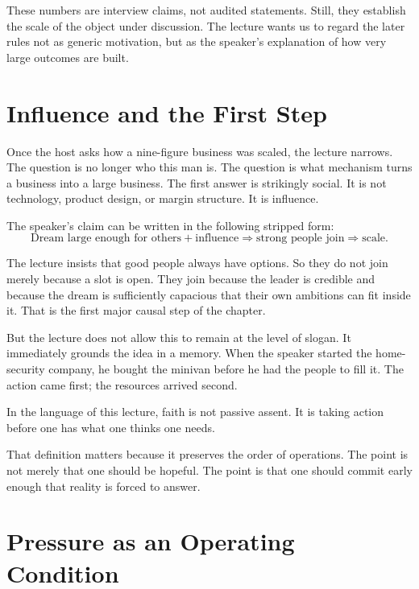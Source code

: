 These numbers are interview claims, not audited statements. Still, they establish the scale of the object under discussion. The lecture wants us to regard the later rules not as generic motivation, but as the speaker's explanation of how very large outcomes are built.

\section{Influence and the First Step}

Once the host asks how a nine-figure business was scaled, the lecture narrows. The question is no longer who this man is. The question is what mechanism turns a business into a large business. The first answer is strikingly social. It is not technology, product design, or margin structure. It is influence.

The speaker's claim can be written in the following stripped form:
\begin{equation}
\text{Dream large enough for others} + \text{influence}
\Longrightarrow
\text{strong people join}
\Longrightarrow
\text{scale}.
\end{equation}

The lecture insists that good people always have options. So they do not join merely because a slot is open. They join because the leader is credible and because the dream is sufficiently capacious that their own ambitions can fit inside it. That is the first major causal step of the chapter.

But the lecture does not allow this to remain at the level of slogan. It immediately grounds the idea in a memory. When the speaker started the home-security company, he bought the minivan before he had the people to fill it. The action came first; the resources arrived second.

\begin{definition}
In the language of this lecture, faith is not passive assent. It is taking action before one has what one thinks one needs.
\end{definition}

That definition matters because it preserves the order of operations. The point is not merely that one should be hopeful. The point is that one should commit early enough that reality is forced to answer.

\section{Pressure as an Operating Condition}

